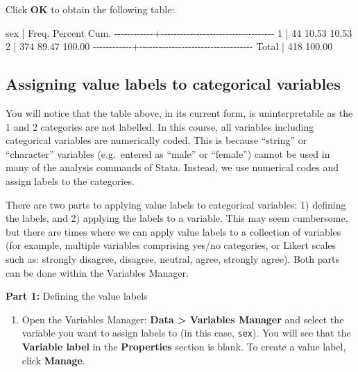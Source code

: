 \documentclass[
]{memoir}
\newenvironment{Shaded}{\begin{snugshade}}{\end{snugshade}}
\newcommand{\NormalTok}[1]{#1}
\providecommand{\tightlist}{%
  \setlength{\itemsep}{0pt}\setlength{\parskip}{0pt}}
\begin{document}
Click \textbf{OK} to obtain the following table:

\begin{Shaded}
\begin{Highlighting}[]
\NormalTok{        sex |      Freq.     Percent        Cum.}
\NormalTok{{-}{-}{-}{-}{-}{-}{-}{-}{-}{-}{-}{-}+{-}{-}{-}{-}{-}{-}{-}{-}{-}{-}{-}{-}{-}{-}{-}{-}{-}{-}{-}{-}{-}{-}{-}{-}{-}{-}{-}{-}{-}{-}{-}{-}{-}{-}{-}}
\NormalTok{          1 |         44       10.53       10.53}
\NormalTok{          2 |        374       89.47      100.00}
\NormalTok{{-}{-}{-}{-}{-}{-}{-}{-}{-}{-}{-}{-}+{-}{-}{-}{-}{-}{-}{-}{-}{-}{-}{-}{-}{-}{-}{-}{-}{-}{-}{-}{-}{-}{-}{-}{-}{-}{-}{-}{-}{-}{-}{-}{-}{-}{-}{-}}
\NormalTok{      Total |        418      100.00}
\end{Highlighting}
\end{Shaded}

\hypertarget{assigning-value-labels-to-categorical-variables}{%
\subsection{Assigning value labels to categorical variables}\label{assigning-value-labels-to-categorical-variables}}

You will notice that the table above, in its current form, is uninterpretable as the 1 and 2 categories are not labelled. In this course, all variables including categorical variables are numerically coded. This is because ``string'' or ``character'' variables (e.g.~entered as ``male'' or ``female'') cannot be used in many of the analysis commands of Stata. Instead, we use numerical codes and assign labels to the categories.

There are two parts to applying value labels to categorical variables: 1) defining the labels, and 2) applying the labels to a variable. This may seem cumbersome, but there are times where we can apply value labels to a collection of variables (for example, multiple variables comprising yes/no categories, or Likert scales such as: strongly disagree, disagree, neutral, agree, strongly agree). Both parts can be done within the Variables Manager.

\textbf{Part 1:} Defining the value labels

\begin{enumerate}
\def\labelenumi{\arabic{enumi}.}
\tightlist
\item
  Open the Variables Manager: \textbf{Data \textgreater{} Variables Manager} and select the variable you want to assign labels to (in this case, \texttt{sex}). You will see that the \textbf{Variable label} in the \textbf{Properties} section is blank. To create a value label, click \textbf{Manage}.
\end{enumerate}
\end{document}
